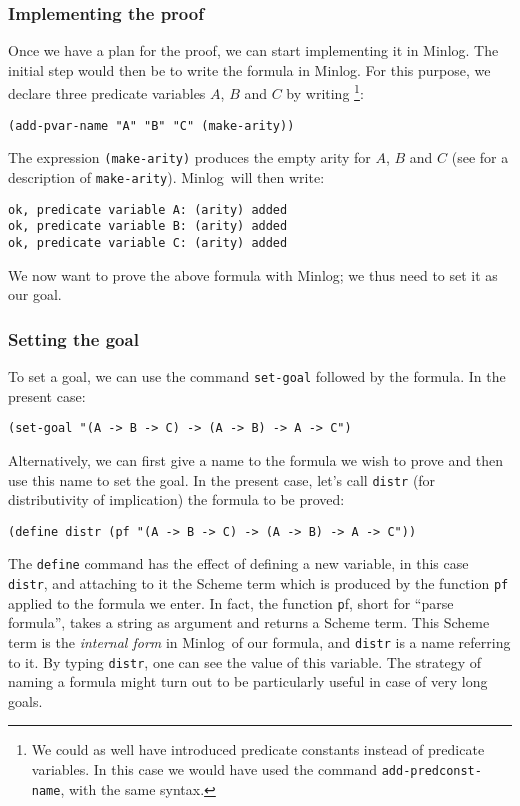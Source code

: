 \documentclass[12pt]{amsart}
\newcommand{\inquotes}[1]{``#1''}
\newcommand{\mi}{Minlog}
\begin{document}
\subsubsection{Implementing the proof}
Once we have a plan for the proof, we can start implementing it in
\mi.  The initial step would then be to write the formula in \mi.  For
this purpose, we declare three predicate variables $A$, $B$ and $C$ by
writing \footnote{We could as well have introduced predicate constants
  instead of predicate variables.  In this case we would have used the
  command \texttt{add-predconst-name}, with the same syntax. }:
\begin{verbatim}
(add-pvar-name "A" "B" "C" (make-arity))
\end{verbatim}
The expression \texttt{(make-arity)} produces the empty arity for $A$,
$B$ and $C$ (see \cite{minlogman} for a description of
\texttt{make-arity}).  \mi\ will then write:
\begin{verbatim}
ok, predicate variable A: (arity) added
ok, predicate variable B: (arity) added
ok, predicate variable C: (arity) added
\end{verbatim}

We now want to prove the above formula with \mi; we thus need to set
it as our goal.


\subsubsection{Setting the goal}
To set a goal, we can use the command \texttt{set-goal} followed by
the formula.  In the present case:
\begin{verbatim}
(set-goal "(A -> B -> C) -> (A -> B) -> A -> C")
\end{verbatim}
Alternatively, we can first give a name to the formula we wish to
prove and then use this name to set the goal.  In the present case,
let's call \texttt{distr} (for distributivity of implication) the
formula to be proved:
\begin{verbatim}
(define distr (pf "(A -> B -> C) -> (A -> B) -> A -> C"))
\end{verbatim}

The \texttt{define} command has the effect of defining a new variable,
in this case \texttt{distr}, and attaching to it the Scheme term which
is produced by the function \texttt{pf} applied to the formula we
enter.  In fact, the function {\texttt pf}, short for \inquotes{parse
  formula}, takes a string as argument and returns a Scheme term.
This Scheme term is the \emph{internal form} in \mi\ of our formula,
and \texttt{distr} is a name referring to it.  By typing
\texttt{distr}, one can see the value of this variable.  The strategy
of naming a formula might turn out to be particularly useful in case
of very long goals.
\end{document}
